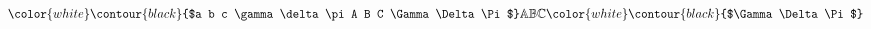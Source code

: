 \documentclass{article}
\begin{document}
\newcommand*{\outline}[1]{\color{white}\contour{black}{#1}}%
$\outline{$a b c \gamma \delta \pi A B C \Gamma \Delta \Pi$} 
\mathbb{A B C} \outline{$\Gamma \Delta \Pi$}$
\end{document}
